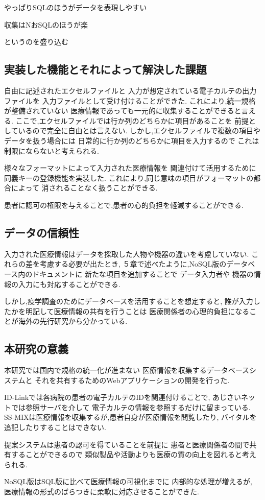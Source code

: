 やっぱりSQLのほうがデータを表現しやすい

収集はNおSQLのほうが楽

というのを盛り込む

\subsection{実装した機能とそれによって解決した課題}
  自由に記述されたエクセルファイルと
  入力が想定されている電子カルテの出力ファイルを
  入力ファイルとして受け付けることができた.
  これにより,統一規格が整備されていない
  医療情報であっても一元的に収集することができると言える.
  ここで,エクセルファイルでは行か列のどちらかに項目があることを
  前提としているので完全に自由とは言えない.
  しかし,エクセルファイルで複数の項目やデータを扱う場合には
  日常的に行か列のどちらかに項目を入力するので
  これは制限にならないと考えられる.

  様々なフォーマットによって入力された医療情報を
  関連付けて活用するために同義キーの登録機能を実装した.
  これにより,同じ意味の項目がフォーマットの都合によって
  消されることなく扱うことができる.

  患者に認可の権限を与えることで,患者の心的負担を軽減することができる.


\subsection{データの信頼性}
    入力された医療情報はデータを採取した人物や機器の違いを考慮していない.
    これらの差を考慮する必要が出たとき,
    ５章で述べたように,NoSQL版のデータベース内のドキュメントに
    新たな項目を追加することで
    データ入力者や
    機器の情報の入力にも対応することができる.

    しかし,疫学調査のためにデータベースを活用することを想定すると,
    誰が入力したかを明記して医療情報の共有を行うことは
    医療関係者の心理的負担になることが海外の先行研究から分かっている.
    \cite{bibi10}


\subsection{本研究の意義}
  本研究では国内で規格の統一化が進まない
  医療情報を収集するデータベースシステムと
  それを共有するためのWebアプリケーションの開発を行った.


  ID-Linkでは各病院の患者の電子カルテのIDを関連付けることで,
  あじさいネットでは参照サーバを介して
  電子カルテの情報を参照するだけに留まっている.
  SS-MIXは医療情報を収集するが,患者自身が医療情報を閲覧したり,
  バイタルを追記したりすることはできない.

  提案システムは患者の認可を得ていることを前提に
  患者と医療関係者の間で共有することができるので
  類似製品や活動よりも医療の質の向上を図れると考えられる.

  NoSQL版はSQL版に比べて医療情報の可視化までに
  内部的な処理が増えるが,
  医療情報の形式のばらつきに柔軟に対応させることができた.
